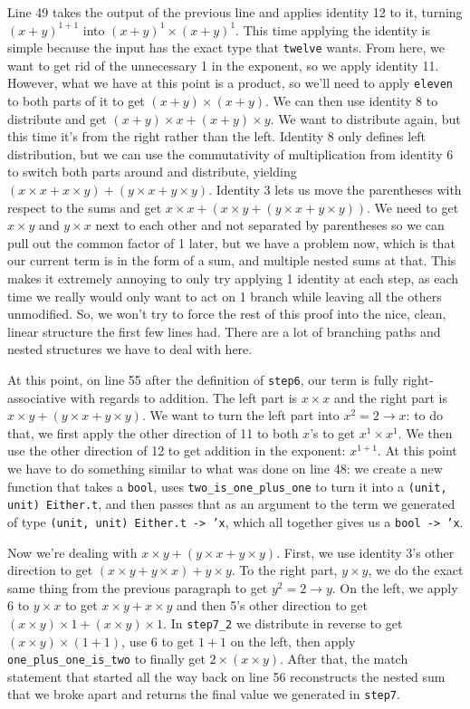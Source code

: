\documentclass[12pt]{article}
\begin{document}
Line 49 takes the output of the previous line and applies identity 12 to it, turning $(x+y)^{1+1}$ into $(x+y)^1 \times (x + y)^1$. This time applying the identity is simple because the input has the exact type that \texttt{twelve} wants. From here, we want to get rid of the unnecessary 1 in the exponent, so we apply identity 11. However, what we have at this point is a product, so we'll need to apply \texttt{eleven} to both parts of it to get $(x + y) \times (x + y)$. We can then use identity 8 to distribute and get $(x + y) \times x + (x + y) \times y$. We want to distribute again, but this time it's from the right rather than the left. Identity 8 only defines left distribution, but we can use the commutativity of multiplication from identity 6 to switch both parts around and distribute, yielding $(x \times x + x \times y) + (y \times x + y \times y)$. Identity 3 lets us move the parentheses with respect to the sums and get $x \times x + (x \times y + (y \times x + y \times y))$. We need to get $x \times y$ and $y \times x$ next to each other and not separated by parentheses so we can pull out the common factor of 1 later, but we have a problem now, which is that our current term is in the form of a sum, and multiple nested sums at that. This makes it extremely annoying to only try applying 1 identity at each step, as each time we really would only want to act on 1 branch while leaving all the others unmodified. So, we won't try to force the rest of this proof into the nice, clean, linear structure the first few lines had. There are a lot of branching paths and nested structures we have to deal with here.

At this point, on line 55 after the definition of \texttt{step6}, our term is fully right-associative with regards to addition. The left part is $x \times x$ and the right part is $x \times y + (y \times x + y \times y)$. We want to turn the left part into $x^2 = 2 \to x$: to do that, we first apply the other direction of 11 to both $x$'s to get $x^1 \times x^1$. We then use the other direction of 12 to get addition in the exponent: $x^{1+1}$. At this point we have to do something similar to what was done on line 48: we create a new function that takes a \texttt{bool}, uses \texttt{two\_is\_one\_plus\_one} to turn it into a \texttt{(unit, unit) Either.t}, and then passes that as an argument to the term we generated of type \texttt{(unit, unit) Either.t -> 'x}, which all together gives us a \texttt{bool -> 'x}.

Now we're dealing with $x \times y + (y \times x + y \times y)$. First, we use identity 3's other direction to get $(x \times y + y \times x) + y \times y$. To the right part, $y \times y$, we do the exact same thing from the previous paragraph to get $y^2 = 2 \to y$. On the left, we apply 6 to $y \times x$ to get $x \times y + x \times y$ and then 5's other direction to get $(x \times y) \times 1 + (x \times y) \times 1$. In \texttt{step7\_2} we distribute in reverse to get $(x \times y) \times (1 + 1)$, use 6 to get $1 + 1$ on the left, then apply \texttt{one\_plus\_one\_is\_two} to finally get $2 \times (x \times y)$. After that, the match statement that started all the way back on line 56 reconstructs the nested sum that we broke apart and returns the final value we generated in \texttt{step7}.
\end{document}
